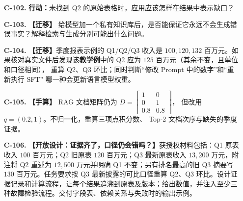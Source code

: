 \begin{enumerate}[label={},leftmargin=4.8em,itemsep=4pt]
\item[\textbf{C-102.}] \leavevmode{}\label{exercise:C-102}\label{exercise:missing-evidence-response}\textbf{行动：}未找到 Q2 的原始表格时，应用应该怎样在结果中表示缺口？
\item[\textbf{C-103.}] \leavevmode{}\label{exercise:C-103}\label{exercise:rag-failure-modes}\textbf{【迁移】} 给模型加一个私有知识库后，是否能保证它永远不会生成错误事实？解释检索与生成分别可能出什么问题。
\item[\textbf{C-104.}] \leavevmode{}\label{exercise:C-104}\label{exercise:quarterly-evidence-update}\textbf{【迁移】}季度报表示例的 Q1/Q2/Q3 收入是 $100,120,132$
百万元。如果核对真实文件后发现该\textbf{教学例}中的 Q2 应为
$125$ 百万元（其余不变，且单位和口径相同），
重算 Q2、Q3 环比；同时判断“修改 Prompt 中的数字”和“重新执行 SFT”
哪一种会更新语言模型权重。
\item[\textbf{C-105.}] \leavevmode{}\label{exercise:C-105}\label{exercise:rag-query-ranking}\textbf{【手算】} RAG 文档矩阵仍为
$D=\begin{bmatrix}1&0\\0&1\\0.8&0.8\end{bmatrix}$，
但改用 $q=(0.2,1)$。不归一化，重算三项点积分数、
Top-2 文档次序与缺失的季度证据。
\item[\textbf{C-106.}] \leavevmode{}\label{exercise:C-106}\label{exercise:rag-versioned-evidence-audit}\textbf{【开放设计：证据齐了，口径仍会错吗？】}获授权材料包括：Q1 原表收入 $100$ 百万元；Q2 旧原表 $120$ 百万元；Q3 最新原表收入 $13{,}200$ 万元，附注将 Q2 重述为 $12{,}500$ 万元并明确 Q1 不变；另有排名最高的旧 Q3 摘要写 $130$ 百万元。任务要求按 Q3 最新披露的可比口径重算 Q2、Q3 环比。设计证据记录和计算流程，让每个结果追溯到原表及版本；给出数值，并注入至少三种故障检验流程。交付字段表、依赖关系与失败时的输出示例。
\end{enumerate}
